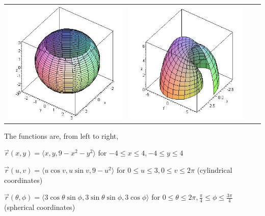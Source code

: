 \begin{center}
\begin{tabular}{cccc}
\includegraphics[width=\mywidth]{functions/parasurface-3}&
\includegraphics[width=\mywidth]{functions/parasurface-4}
\end{tabular}
\end{center}
The functions are, from left to right, 

$\vec r(x,y) = \langle x,y,9-x^2-y^2\rangle$ for $-4\leq x\leq 4,-4\leq y\leq 4$

$\vec r(u,v)=\langle u\cos v,u\sin v ,9-u^2\rangle$ for $0\leq u\leq 3,0\leq v\leq 2\pi$ (cylindrical coordinates) 

$\vec r(\theta,\phi)=\langle3\cos\theta\sin\phi,3\sin\theta\sin\phi,3\cos\phi\rangle$ for $0\leq \theta\leq 2\pi,\frac{\pi}{4}\leq \phi\leq \frac{3\pi}{4}$ (spherical coordinates) 

